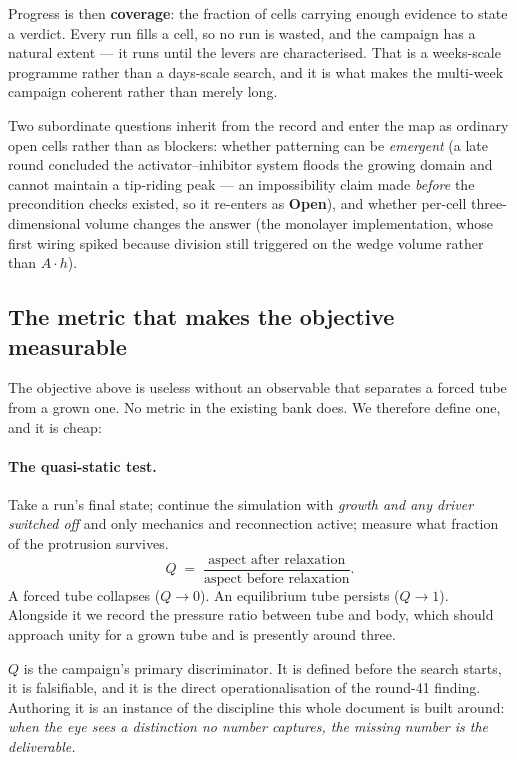 \documentclass[11pt]{article}
\begin{document}
Progress is then \textbf{coverage}: the fraction of cells carrying enough evidence to state a
verdict. Every run fills a cell, so no run is wasted, and the campaign has a natural extent ---
it runs until the levers are characterised. That is a weeks-scale programme rather than a
days-scale search, and it is what makes the multi-week campaign coherent rather than merely
long.

Two subordinate questions inherit from the record and enter the map as ordinary open cells
rather than as blockers: whether patterning can be \emph{emergent} (a late round concluded the
activator--inhibitor system floods the growing domain and cannot maintain a tip-riding peak ---
an impossibility claim made \emph{before} the precondition checks existed, so it re-enters as
\textbf{Open}), and whether per-cell three-dimensional volume changes the answer (the monolayer
implementation, whose first wiring spiked because division still triggered on the wedge volume
rather than $A\!\cdot\!h$).

\subsection{The metric that makes the objective measurable}

The objective above is useless without an observable that separates a forced tube from a grown
one. No metric in the existing bank does. We therefore define one, and it is cheap:

\paragraph{The quasi-static test.} Take a run's final state; continue the simulation with
\emph{growth and any driver switched off} and only mechanics and reconnection active; measure
what fraction of the protrusion survives.
\[
Q \;=\; \frac{\text{aspect after relaxation}}{\text{aspect before relaxation}} .
\]
A forced tube collapses ($Q \to 0$). An equilibrium tube persists ($Q \to 1$). Alongside it we
record the pressure ratio between tube and body, which should approach unity for a grown tube and
is presently around three.

$Q$ is the campaign's primary discriminator. It is defined before the search starts, it is
falsifiable, and it is the direct operationalisation of the round-41 finding. Authoring it is an
instance of the discipline this whole document is built around: \emph{when the eye sees a
distinction no number captures, the missing number is the deliverable.}
\end{document}

